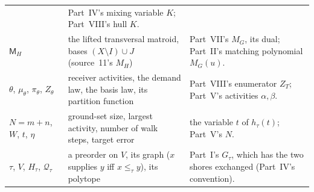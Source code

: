 \documentclass[11pt]{article}
\numberwithin{equation}{section}
\theoremstyle{definition}
\newcommand{\Qt}{\mathcal Q_\tau}
\begin{document}
\begin{table}[tbp]
\begin{tabularx}{\textwidth}{@{}>{\raggedright}p{}>{\raggedright}p{}Y@{}}
 & Part~IV's mixing variable $K$; Part~VIII's hull $K$.\\
$\mathsf M_H$ & the lifted transversal matroid, bases $(X\setminus I)\cup J$
 (source~11's $M_H$) & Part~VII's $M_G$, its dual; Part~II's matching
 polynomial $M_G(u)$.\\
$\theta$, $\mu_\theta$, $\pi_\theta$, $Z_\theta$ & receiver activities,
 the demand law, the basis law, its partition function & Part~VIII's
 enumerator $Z_T$; Part~V's activities $\alpha,\beta$.\\
$N=m+n$, $W$, $t$, $\eta$ & ground-set size, largest activity, number of
 walk steps, target error & the variable $t$ of $h_\tau(t)$; Part~V's
 $N$.\\
$\tau$, $V$, $H_\tau$, $\Qt$ & a preorder on $V$, its graph ($x$ supplies
 $y$ iff $x\le_\tau y$), its polytope & Part~I's $G_\tau$, which has the
 two shores exchanged (Part~IV's convention).\\
\bottomrule
\end{tabularx}
\end{table}
\end{document}
